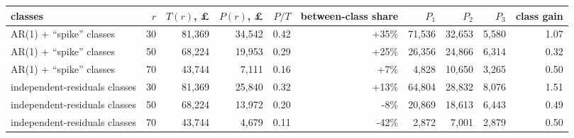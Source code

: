 \begin{tabular}{lrrrrrrrrr}
\toprule
classes & $r$ & $T(r)$, \pounds & $P(r)$, \pounds & $P/T$ & between-class share & $P_1$ & $P_2$ & $P_3$ & class gain \\
\midrule
AR(1) + ``spike'' classes & 30 & 81,369 & 34,542 & 0.42 & +35\% & 71,536 & 32,653 & 5,580 & 1.07 \\
AR(1) + ``spike'' classes & 50 & 68,224 & 19,953 & 0.29 & +25\% & 26,356 & 24,866 & 6,314 & 0.32 \\
AR(1) + ``spike'' classes & 70 & 43,744 & 7,111 & 0.16 & +7\% & 4,828 & 10,650 & 3,265 & 0.50 \\
independent-residuals classes & 30 & 81,369 & 25,840 & 0.32 & +13\% & 64,804 & 28,832 & 8,076 & 1.51 \\
independent-residuals classes & 50 & 68,224 & 13,972 & 0.20 & -8\% & 20,869 & 18,613 & 6,443 & 0.49 \\
independent-residuals classes & 70 & 43,744 & 4,679 & 0.11 & -42\% & 2,872 & 7,001 & 2,879 & 0.50 \\
\bottomrule
\end{tabular}
